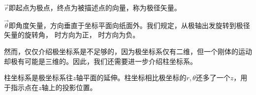 \begin{Itemize}
    \item $\vec{r}$即起点为极点，终点为被描述点的向量，称为极径矢量。
    \item $\vec{\theta}$即角度矢量，方向垂直于坐标平面向纸面外。我们规定，从极轴出发旋转到极径矢量的旋转角， 时方向为正， 时方向为负\footnotemark。
\end{Itemize}

然而，仅仅介绍极坐标系是不足够的，因为极坐标系仅有二维，但一个刚体的运动却极有可能是三维的。因此，我们还需要进一步介绍柱坐标系。

柱坐标系是极坐标系往$z$轴平面的延伸。柱坐标相比极坐标的$r,\theta$还多了一个$z$，用于指示点在$z$轴上的投影位置。


